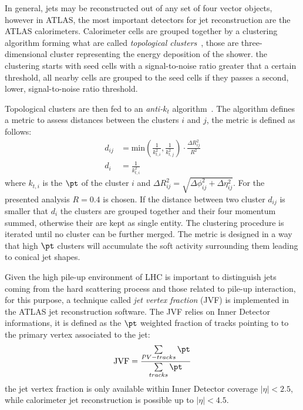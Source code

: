 In general, jets may be reconstructed out of any set of four vector objects, 
however in ATLAS, the most important detectors for jet reconstruction are the ATLAS calorimeters.
Calorimeter cells are grouped together by a clustering algorithm forming what are called \emph{topological clusters}~\cite{TopoClusterAlgo},
those are three-dimensional cluster representing the energy deposition of the shower.
the clustering starts with seed cells with a signal-to-noise ratio greater that a certain threshold, 
all nearby cells are grouped to the seed cells if they passes a second, lower, signal-to-noise ratio threshold.

Topological clusters are then fed to an \emph{anti-$k_t$} algorithm~\cite{antikt}. The algorithm defines a metric
to assess distances between the clusters $i$ and $j$, the metric is defined as follows:
\begin{align}
d_{ij} &= \text{min}(\frac{1}{k_{t,i}^2}, \frac{1}{k_{t,j}^2}) \cdot \frac{\Delta R_{ij}^2}{R^2}  \\
d_i   &= \frac{1}{k_{t,i}^2} 
\end{align}
where $k_{t,i}$ is the $\pt$ of the cluster $i$ and $\Delta R_{ij}^2 = \sqrt{\Delta\phi_{ij}^2 + \Delta\eta_{ij}^2}$. For
the presented  analysis $R=0.4$ is chosen.
If the distance between two cluster $d_{ij}$ is smaller that $d_i$ the clusters are grouped together and their four momentum
summed, otherwise their are kept as single entity. The clustering procedure is iterated until no cluster can be further merged. 
The metric is designed in a way that high $\pt$ clusters will accumulate the soft activity surrounding them leading to conical
jet shapes. 

Given the high pile-up environment of LHC  is important to distinguish jets coming from the hard scattering process and those
related to pile-up interaction, for this purpose, a technique called \emph{jet vertex fraction} (JVF) is implemented in the 
ATLAS jet reconstruction software.
The JVF relies on Inner Detector informations, it is defined as the $\pt$ weighted fraction of tracks pointing
to to the primary vertex associated to the jet:
\begin{equation}
\text{JVF} = \frac{\sum\limits_{PV-tracks}\pt}{\sum\limits_{tracks}\pt}
\end{equation} 
the jet vertex fraction  is only available within Inner Detector coverage $|\eta| < 2.5$,
while calorimeter jet reconstruction is possible up to $|\eta| < 4.5$.

